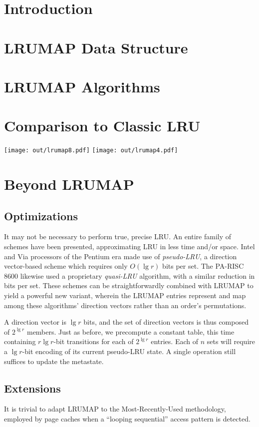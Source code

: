 \documentclass[letterpaper,10pt]{article}
\makeatletter
\newenvironment{figurehere}
{\def\@captype{figure}}
{}
\makeatother
\begin{document}
\begin{multicols}{2}
\section{Introduction}

\section{LRUMAP Data Structure}
\section{LRUMAP Algorithms}
\section{Comparison to Classic LRU}
\begin{figurehere}
	\centering
	\texttt{[image: out/lrumap8.pdf]}
\end{figurehere}
\begin{figurehere}
	\centering
	\texttt{[image: out/lrumap4.pdf]}
\end{figurehere}
\section{Beyond LRUMAP}
\subsection{Optimizations}
It may not be necessary to perform true, precise LRU. An entire family of
schemes have been presented, approximating LRU in less time and/or space.
Intel\cite{shanley} and Via processors of the Pentium era made use of
\textit{pseudo-LRU}, a direction vector-based scheme which requires only
$O(\lg{r})$ bits per set\cite{handy}. The PA-RISC 8600\cite{hurd} likewise used
a proprietary \textit{quasi-LRU} algorithm, with a similar reduction in bits
per set. These schemes can be straightforwardly combined with LRUMAP to yield a
powerful new variant, wherein the LRUMAP entries represent and map among these
algorithms' direction vectors rather than an order's permutations.

A direction vector is $\lg{r}$ bits, and the set of direction vectors is thus
composed of $2^{\lg{r}}$ members. Just as before, we precompute a constant
table, this time containing $r \lg{r}$-bit transitions for each of $2^{\lg{r}}$
entries. Each of $n$ sets will require a $\lg{r}$-bit encoding of its current
pseudo-LRU state. A single operation still suffices to update the metastate.
\subsection{Extensions}
It is trivial to adapt LRUMAP to the Most-Recently-Used methodology, employed
by page caches when a ``looping sequential''\cite{dewitt} access pattern is
detected.
\cite{varghese}
\cite{xu}


\end{multicols}
\end{document}
